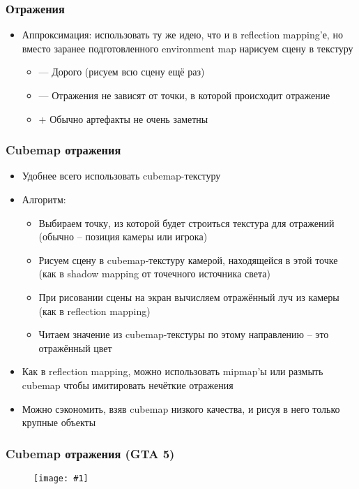 \documentclass{beamer}
\newcommand{\slideimage}[1]{
  \begin{figure}
    \begin{adjustbox}{width=\textwidth, totalheight=\textheight-2\baselineskip-2\baselineskip,keepaspectratio}
      \texttt{[image: \#1]}
    \end{adjustbox}
  \end{figure}
}
\begin{document}
\begin{frame}[fragile]
\frametitle{Отражения}
\begin{itemize}
\item Аппроксимация: использовать ту же идею, что и в reflection mapping'е, но вместо заранее подготовленного environment map нарисуем сцену в текстуру
\pause
\begin{itemize}
\item {\color{red}—} Дорого (рисуем всю сцену ещё раз)
\item {\color{red}—} Отражения не зависят от точки, в которой происходит отражение
\item {\color{green}+} Обычно артефакты не очень заметны
\end{itemize}
\end{itemize}
\end{frame}

\begin{frame}[fragile]
\frametitle{Cubemap отражения}
\begin{itemize}
\item Удобнее всего использовать cubemap-текстуру
\pause
\item Алгоритм:
\begin{itemize}
\item Выбираем точку, из которой будет строиться текстура для отражений (обычно -- позиция камеры или игрока)
\pause
\item Рисуем сцену в cubemap-текстуру камерой, находящейся в этой точке (как в shadow mapping от точечного источника света)
\pause
\item При рисовании сцены на экран вычисляем отражённый луч из камеры (как в reflection mapping)
\pause
\item Читаем значение из cubemap-текстуры по этому направлению -- это отражённый цвет
\end{itemize}
\pause
\item Как в reflection mapping, можно использовать mipmap'ы или размыть cubemap чтобы имитировать нечёткие отражения
\pause
\item Можно сэкономить, взяв cubemap низкого качества, и рисуя в него только крупные объекты
\end{itemize}
\end{frame}

\begin{frame}[fragile]
\frametitle{Cubemap отражения (GTA 5)}
\slideimage{gta_reflections.jpg}
\end{frame}
\end{document}

